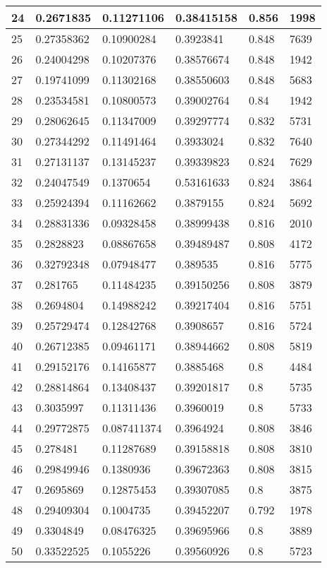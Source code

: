 \begin{longtable}{|l|l|l|l|l|l|}
24 & 0.2671835 & 0.11271106 & 0.38415158 & 0.856 & 1998 \\ \hline 
25 & 0.27358362 & 0.10900284 & 0.3923841 & 0.848 & 7639 \\ \hline 
26 & 0.24004298 & 0.10207376 & 0.38576674 & 0.848 & 1942 \\ \hline 
27 & 0.19741099 & 0.11302168 & 0.38550603 & 0.848 & 5683 \\ \hline 
28 & 0.23534581 & 0.10800573 & 0.39002764 & 0.84 & 1942 \\ \hline 
29 & 0.28062645 & 0.11347009 & 0.39297774 & 0.832 & 5731 \\ \hline 
30 & 0.27344292 & 0.11491464 & 0.3933024 & 0.832 & 7640 \\ \hline 
31 & 0.27131137 & 0.13145237 & 0.39339823 & 0.824 & 7629 \\ \hline 
32 & 0.24047549 & 0.1370654 & 0.53161633 & 0.824 & 3864 \\ \hline 
33 & 0.25924394 & 0.11162662 & 0.3879155 & 0.824 & 5692 \\ \hline 
34 & 0.28831336 & 0.09328458 & 0.38999438 & 0.816 & 2010 \\ \hline 
35 & 0.2828823 & 0.08867658 & 0.39489487 & 0.808 & 4172 \\ \hline 
36 & 0.32792348 & 0.07948477 & 0.389535 & 0.816 & 5775 \\ \hline 
37 & 0.281765 & 0.11484235 & 0.39150256 & 0.808 & 3879 \\ \hline 
38 & 0.2694804 & 0.14988242 & 0.39217404 & 0.816 & 5751 \\ \hline 
39 & 0.25729474 & 0.12842768 & 0.3908657 & 0.816 & 5724 \\ \hline 
40 & 0.26712385 & 0.09461171 & 0.38944662 & 0.808 & 5819 \\ \hline 
41 & 0.29152176 & 0.14165877 & 0.3885468 & 0.8 & 4484 \\ \hline 
42 & 0.28814864 & 0.13408437 & 0.39201817 & 0.8 & 5735 \\ \hline 
43 & 0.3035997 & 0.11311436 & 0.3960019 & 0.8 & 5733 \\ \hline 
44 & 0.29772875 & 0.087411374 & 0.3964924 & 0.808 & 3846 \\ \hline 
45 & 0.278481 & 0.11287689 & 0.39158818 & 0.808 & 3810 \\ \hline 
46 & 0.29849946 & 0.1380936 & 0.39672363 & 0.808 & 3815 \\ \hline 
47 & 0.2695869 & 0.12875453 & 0.39307085 & 0.8 & 3875 \\ \hline 
48 & 0.29409304 & 0.1004735 & 0.39452207 & 0.792 & 1978 \\ \hline 
49 & 0.3304849 & 0.08476325 & 0.39695966 & 0.8 & 3889 \\ \hline 
50 & 0.33522525 & 0.1055226 & 0.39560926 & 0.8 & 5723 \\ \hline 
\end{longtable}